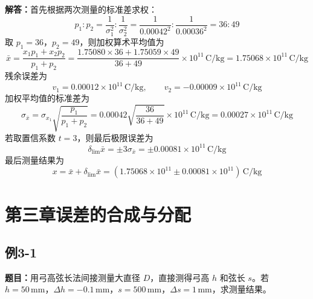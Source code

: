 \documentclass[UTF8,zihao=-4]{ctexart}
\newcommand{\problem}[1]{\subsection*{#1}}
\newcommand{\timu}{\noindent\textbf{题目：}}
\newcommand{\jieda}{\noindent\textbf{解答：}}
\begin{document}
\jieda 首先根据两次测量的标准差求权：
\begin{equation*}
    p_1:p_2=\frac{1}{\sigma_1^2}:\frac{1}{\sigma_2^2}
    =\frac{1}{0.00042^2}:\frac{1}{0.00036^2}=36:49
\end{equation*}
取 $p_1=36$，$p_2=49$，则加权算术平均值为
\begin{equation*}
    \bar{x}=\frac{x_1p_1+x_2p_2}{p_1+p_2}
    =\frac{1.75080\times36+1.75059\times49}{36+49}\times10^{11}\,\mathrm{C/kg}
    =1.75068\times10^{11}\,\mathrm{C/kg}
\end{equation*}
残余误差为
\begin{equation*}
    v_1=0.00012\times10^{11}\,\mathrm{C/kg},
    \qquad
    v_2=-0.00009\times10^{11}\,\mathrm{C/kg}
\end{equation*}
加权平均值的标准差为
\begin{equation*}
    \sigma_{\bar{x}}=\sigma_{x_1}\sqrt{\frac{p_1}{p_1+p_2}}
    =0.00042\sqrt{\frac{36}{36+49}}\times10^{11}\,\mathrm{C/kg}
    =0.00027\times10^{11}\,\mathrm{C/kg}
\end{equation*}
若取置信系数 $t=3$，则最后极限误差为
\begin{equation*}
    \delta_{\lim}\bar{x}=\pm3\sigma_{\bar{x}}=\pm0.00081\times10^{11}\,\mathrm{C/kg}
\end{equation*}
最后测量结果为
\begin{equation*}
    x=\bar{x}+\delta_{\lim}\bar{x}=(1.75068\times10^{11}\pm0.00081\times10^{11})\,\mathrm{C/kg}
\end{equation*}

\section*{第三章\quad 误差的合成与分配}

\problem{例3-1}
\timu 用弓高弦长法间接测量大直径 $D$，直接测得弓高 $h$ 和弦长 $s$。若 $h=50\,\mathrm{mm}$，$\Delta h=-0.1\,\mathrm{mm}$，$s=500\,\mathrm{mm}$，$\Delta s=1\,\mathrm{mm}$，求测量结果。
\end{document}
